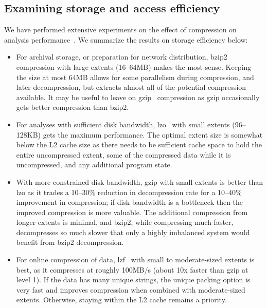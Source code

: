 \documentclass{acm_proc_article-sp}
\begin{document}
\subsection{Examining storage and access efficiency}\label{sec:efficiency}

We have performed extensive experiments on the effect 
of compression
on analysis performance~\cite{DSTechnicalReportSnapshot}.  We
summarize the results on storage efficiency below:

\begin{itemize}

\item For archival storage, or preparation for network distribution,
bzip2~\cite{BZIP} compression with large extents (16--64MB) makes the
most sense.  Keeping the size at most 64MB allows for some parallelism
during compression, and later decompression, but extracts almost all
of the potential compression available.  It may be useful to leave on
gzip~\cite{GZIP} compression 
as gzip occasionally gets better compression than
bzip2.

\item For analyses with sufficient disk bandwidth, lzo~\cite{LZO} with
small extents (96--128KB) gets the maximum performance.  The optimal
extent size is somewhat below the L2 cache size as there needs to be
sufficient cache space to hold the entire uncompressed extent, some of
the compressed data while it is uncompressed, and any additional
program state.

\item With more constrained disk bandwidth, gzip
with
small extents is better than lzo as it trades a 10--30\% reduction in
decompression rate for a 10--40\% improvement in compression; if disk
bandwidth is a 
bottleneck then the improved compression is more valuable.
The additional compression from longer extents is minimal, and bzip2,
while compressing much faster, decompresses so much slower that only a
highly imbalanced system would benefit from bzip2 decompression.

\item For online compression of data, lzf~\cite{LZF} with small to
moderate-sized extents is 
best, as it compresses at roughly 100MB/s (about 10x
faster than gzip at level 1).
If the data has many unique strings, the unique packing option
is very fast and improves compression when combined with 
moderate-sized extents.
Otherwise, staying within the L2 cache remains a priority.
\end{itemize}
\end{document}
